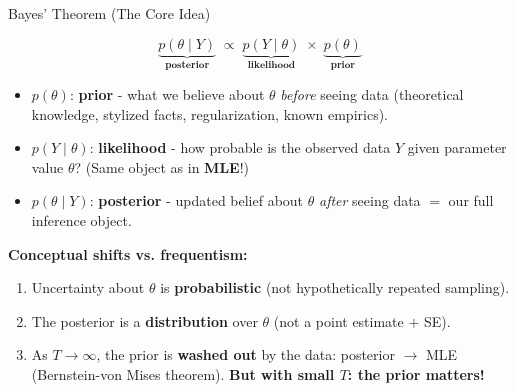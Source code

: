 \documentclass{beamer}
\begin{document}
\begin{frame}{Bayes' Theorem (The Core Idea)}
\small

\[
\underbrace{p(\theta \mid Y)}_{\textbf{posterior}}
\;\propto\;
\underbrace{p(Y \mid \theta)}_{\textbf{likelihood}}
\;\times\;
\underbrace{p(\theta)}_{\textbf{prior}}
\]

\medskip
\begin{itemize}
  \item $p(\theta)$: \textbf{prior} - what we believe about $\theta$ \emph{before} seeing data (theoretical knowledge, stylized facts, regularization, known empirics).
  \item $p(Y \mid \theta)$: \textbf{likelihood} - how probable is the observed data $Y$
        given parameter value $\theta$? (Same object as in \textbf{MLE}!)
  \item $p(\theta \mid Y)$: \textbf{posterior} - updated belief about $\theta$ \emph{after}
        seeing data $=$ our full inference object.
\end{itemize}

\pause
\medskip
\textbf{Conceptual shifts vs. frequentism:}
\begin{enumerate}
  \item Uncertainty about $\theta$ is \textbf{probabilistic} (not hypothetically repeated sampling).
  \item The posterior is a \textbf{distribution} over $\theta$ (not a point estimate $+$ SE).
  \item As $T \to \infty$, the prior is \textbf{washed out} by the data: posterior $\to$ MLE
        (Bernstein-von Mises theorem). \textbf{But with small $T$: the prior matters!}
\end{enumerate}

\end{frame}
\end{document}
